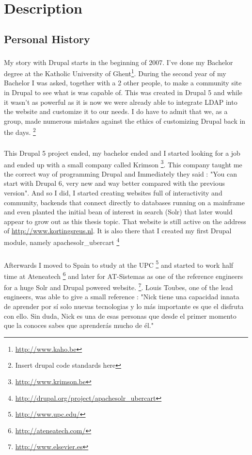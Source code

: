 \chapter{Description}
\label{chap:description}
\section{Personal History}
\paragraph{}
My story with Drupal starts in the beginning of 2007. I've done my Bachelor degree at the Katholic University of Ghent\footnote{\url{http://www.kaho.be}}. During the second year of my Bachelor I was asked, together with a 2 other people, to make a community site in Drupal to see what is was capable of. This was created in Drupal 5 and while it wasn't as powerful as it is now we were already able to integrate LDAP into the website and customize it to our needs. I do have to admit that we, as a group, made numerous mistakes against the ethics of customizing Drupal back in the days. \footnote{Insert drupal code standards here} 

\paragraph{}
This Drupal 5 project ended, my bachelor ended and I started looking for a job and ended up with a small company called Krimson \footnote{\url{http://www.krimson.be}}. This company taught me the correct way of programming Drupal and Immediately they said : "You can start with Drupal 6, very new and way better compared with the previous version". And so I did, I started creating websites full of interactivity and community, backends that connect directly to databases running on a mainframe and even planted the initial bean of interest in search (Solr) that later would appear to grow out as this thesis topic. That website is still active on the address of \url{http://www.kortingsreus.nl}. It is also there that I created my first Drupal module, namely apachesolr\_ubercart \footnote{\url{http://drupal.org/project/apachesolr_ubercart}}
\paragraph{}
Afterwards I moved to Spain to study at the UPC \footnote{\url{http://www.upc.edu/}} and started to work half time at Ateneatech \footnote{\url{http://ateneatech.com/}} and later for AT-Sistemas as one of the reference engineers for a huge Solr and Drupal powered website. \footnote{\url{http://www.elsevier.es}}. Louis Toubes, one of the lead engineers, was able to give a small reference : "Nick tiene una capacidad innata de aprender por sí solo nuevas tecnologias y lo más importante es que el disfruta con ello. Sin duda, Nick es una de esas personas que desde el primer momento que la conoces sabes que aprenderás mucho de él."

